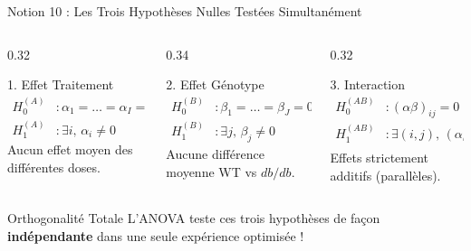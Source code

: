 \documentclass[aspectratio=169,10pt]{beamer}
\begin{document}
\begin{frame}{Notion 10 : Les Trois Hypothèses Nulles Testées Simultanément}
  \begin{columns}[onlytextwidth, T]
    \begin{column}{0.32\linewidth}
      \begin{conceptbox}{1. Effet Traitement}
        \scriptsize
        \begin{align*}
          H_0^{(A)} &: \alpha_1 = \dots = \alpha_I = 0 \\
          H_1^{(A)} &: \exists i, \, \alpha_i \neq 0
        \end{align*}
        Aucun effet moyen des différentes doses.
      \end{conceptbox}
    \end{column}
    \begin{column}{0.34\linewidth}
      \begin{conceptbox}{2. Effet Génotype}
        \scriptsize
        \begin{align*}
          H_0^{(B)} &: \beta_1 = \dots = \beta_J = 0 \\
          H_1^{(B)} &: \exists j, \, \beta_j \neq 0
        \end{align*}
        Aucune différence moyenne WT vs $db/db$.
      \end{conceptbox}
    \end{column}
    \begin{column}{0.32\linewidth}
      \begin{conceptbox}{3. Interaction}
        \scriptsize
        \begin{align*}
          H_0^{(AB)} &: (\alpha\beta)_{ij} = 0 \; (\forall i, j) \\
          H_1^{(AB)} &: \exists (i, j), \, (\alpha\beta)_{ij} \neq 0
        \end{align*}
        Effets strictement additifs (parallèles).
      \end{conceptbox}
    \end{column}
  \end{columns}
  \vspace{1mm}
  \begin{takeawaybox}{Orthogonalité Totale}
    \small L'ANOVA teste ces trois hypothèses de façon \textbf{indépendante} dans une seule expérience optimisée !
  \end{takeawaybox}
\end{frame}

\end{document}
